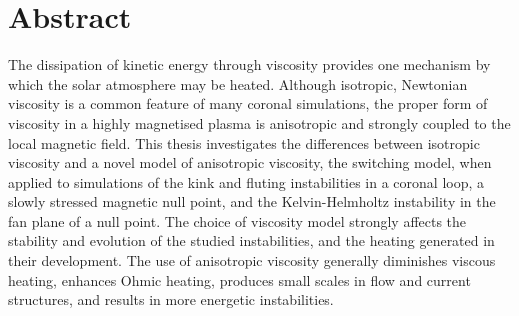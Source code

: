 \chapter{Abstract}

The dissipation of kinetic energy through viscosity provides one mechanism by which the solar atmosphere may be heated. Although isotropic, Newtonian viscosity is a common feature of many coronal simulations, the proper form of viscosity in a highly magnetised plasma is anisotropic and strongly coupled to the local magnetic field. This thesis investigates the differences between isotropic viscosity and a novel model of anisotropic viscosity, the switching model, when applied to simulations of the kink and fluting instabilities in a coronal loop, a slowly stressed magnetic null point, and the Kelvin-Helmholtz instability in the fan plane of a null point. The choice of viscosity model strongly affects the stability and evolution of the studied instabilities, and the heating generated in their development. The use of anisotropic viscosity generally diminishes viscous heating, enhances Ohmic heating, produces small scales in flow and current structures, and results in more energetic instabilities.
